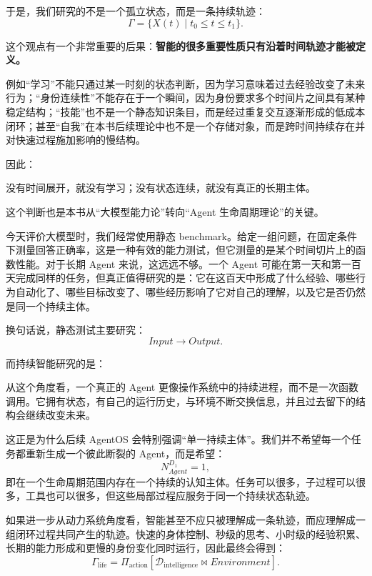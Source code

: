 于是，我们研究的不是一个孤立状态，而是一条持续轨迹：
\[
\Gamma
=
\{X(t)\mid t_0\le t\le t_1\}.
\]

这个观点有一个非常重要的后果：\textbf{智能的很多重要性质只有沿着时间轨迹才能被定义。}

例如“学习”不能只通过某一时刻的状态判断，因为学习意味着过去经验改变了未来行为；“身份连续性”不能存在于一个瞬间，因为身份要求多个时间片之间具有某种稳定结构；“技能”也不是一个静态知识条目，而是经过重复交互逐渐形成的低成本闭环；甚至“自我”在本书后续理论中也不是一个存储对象，而是跨时间持续存在并对快速过程施加影响的慢结构。

因此：
\begin{statementbox}
没有时间展开，就没有学习；没有状态连续，就没有真正的长期主体。
\end{statementbox}

这个判断也是本书从“大模型能力论”转向“Agent 生命周期理论”的关键。

今天评价大模型时，我们经常使用静态 benchmark。给定一组问题，在固定条件下测量回答正确率，这是一种有效的能力测试，但它测量的是某个时间切片上的函数性能。对于长期 Agent 来说，这远远不够。一个 Agent 可能在第一天和第一百天完成同样的任务，但真正值得研究的是：它在这百天中形成了什么经验、哪些行为自动化了、哪些目标改变了、哪些经历影响了它对自己的理解，以及它是否仍然是同一个持续主体。

换句话说，静态测试主要研究：
\[
Input\rightarrow Output.
\]

而持续智能研究的是：
\begin{statementbox}
\centering
{}
\end{statementbox}

从这个角度看，一个真正的 Agent 更像操作系统中的持续进程，而不是一次函数调用。它拥有状态，有自己的运行历史，与环境不断交换信息，并且过去留下的结构会继续改变未来。

这正是为什么后续 AgentOS 会特别强调“单一持续主体”。我们并不希望每一个任务都重新生成一个彼此断裂的 Agent，而是希望：
\[
N_{Agent}^{D_1}=1,
\]
即在一个生命周期范围内存在一个持续的认知主体。任务可以很多，子过程可以很多，工具也可以很多，但这些局部过程应服务于同一个持续状态轨迹。

如果进一步从动力系统角度看，智能甚至不应只被理解成一条轨迹，而应理解成一组闭环过程共同产生的轨迹。快速的身体控制、秒级的思考、小时级的经验积累、长期的能力形成和更慢的身份变化同时运行，因此最终会得到：
\[
\boxed{
\Gamma_{\mathrm{life}}
=
\Pi_{\mathrm{action}}
\left[
\mathcal D_{\mathrm{intelligence}}
\bowtie
Environment
\right].
}
\]

